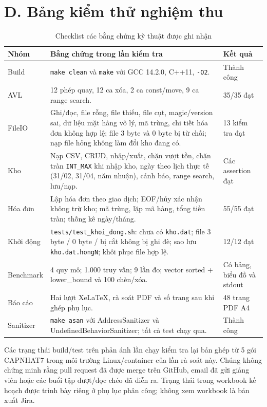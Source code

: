 \section*{D. Bảng kiểm thử nghiệm thu}
\begin{table}[H]
\centering
\caption{Checklist các bằng chứng kỹ thuật được ghi nhận}
\small
\begin{tabular}{@{}p{3cm}p{6.7cm}p{3cm}@{}}
\toprule
\textbf{Nhóm} & \textbf{Bằng chứng trong lần kiểm tra} & \textbf{Kết quả} \\
\midrule
Build & \texttt{make clean} và \texttt{make} với GCC 14.2.0, C++11, \texttt{-O2}. & Thành công \\
AVL & 12 phép quay, 12 ca xóa, 2 ca const/move, 9 ca range search. & 35/35 đạt \\
FileIO & Ghi/đọc, file rỗng, file thiếu, file cụt, magic/version sai, dữ liệu mặt hàng vô lý, mã trùng, chi tiết hóa đơn không hợp lệ; file 3 byte và 0 byte bị từ chối; nạp file hỏng không làm đổi kho đang có. & 13 kiểm tra đạt \\
Kho & Nạp CSV, CRUD, nhập/xuất, chặn vượt tồn, chặn tràn \texttt{INT\_MAX} khi nhập kho, ngày theo lịch thực tế (31/02, 31/04, năm nhuận), cảnh báo, range search, lưu/nạp. & Các assertion đạt \\
Hóa đơn & Lập hóa đơn theo giao dịch; EOF/hủy xác nhận không trừ kho; mã trùng, lặp mã hàng, tổng tiền tràn; thống kê ngày/tháng. & 55/55 đạt \\
Khởi động & \texttt{tests/test\_khoi\_dong.sh}: chưa có \texttt{kho.dat}; file 3 byte / 0 byte / bị cắt không bị ghi đè; sao lưu \texttt{kho.dat.hongN}; khôi phục file hợp lệ. & 12/12 đạt \\
Benchmark & 4 quy mô; 1.000 truy vấn; 9 lần đo; vector sorted + lower\_bound và 100 chèn/xóa. & Có bảng, biểu đồ và stdout \\
Báo cáo & Hai lượt XeLaTeX, rà soát PDF và số trang sau khi ghép phụ lục. & 48 trang PDF A4 \\
Sanitizer & \texttt{make asan} với AddressSanitizer và UndefinedBehaviorSanitizer; tất cả test chạy qua. & Thành công \\
\bottomrule
\end{tabular}
\end{table}

Các trạng thái build/test trên phản ánh lần chạy kiểm tra lại bản ghép từ 5 gói CAPNHAT7 trong môi trường Linux/container của lần rà soát này. Chúng không chứng minh rằng pull request đã được merge trên GitHub, email đã gửi giảng viên hoặc các buổi tập dượt/đọc chéo đã diễn ra. Trạng thái trong workbook kế hoạch được trình bày riêng ở phụ lục phân công; không xem workbook là bản xuất Jira.

